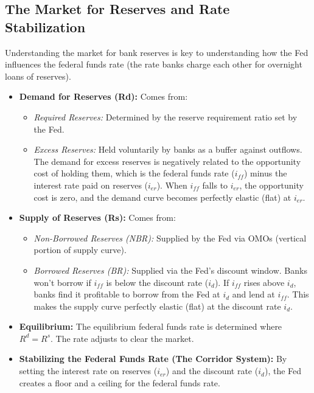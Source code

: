 \subsection{The Market for Reserves and Rate Stabilization}
Understanding the market for bank reserves is key to understanding how the Fed influences the federal funds rate (the rate banks charge each other for overnight loans of reserves).

\begin{itemize}
    \item \textbf{Demand for Reserves (Rd):} Comes from:
        \begin{itemize}
            \item \textit{Required Reserves:} Determined by the reserve requirement ratio set by the Fed.
            \item \textit{Excess Reserves:} Held voluntarily by banks as a buffer against outflows. The demand for excess reserves is negatively related to the opportunity cost of holding them, which is the federal funds rate ($i_{ff}$) minus the interest rate paid on reserves ($i_{er}$). When $i_{ff}$ falls to $i_{er}$, the opportunity cost is zero, and the demand curve becomes perfectly elastic (flat) at $i_{er}$.
        \end{itemize}
    \item \textbf{Supply of Reserves (Rs):} Comes from:
        \begin{itemize}
            \item \textit{Non-Borrowed Reserves (NBR):} Supplied by the Fed via OMOs (vertical portion of supply curve).
            \item \textit{Borrowed Reserves (BR):} Supplied via the Fed's discount window. Banks won't borrow if $i_{ff}$ is below the discount rate ($i_d$). If $i_{ff}$ rises above $i_d$, banks find it profitable to borrow from the Fed at $i_d$ and lend at $i_{ff}$. This makes the supply curve perfectly elastic (flat) at the discount rate $i_d$.
        \end{itemize}
    \item \textbf{Equilibrium:} The equilibrium federal funds rate is determined where $R^d = R^s$. The rate adjusts to clear the market.
    \item \textbf{Stabilizing the Federal Funds Rate (The Corridor System):} By setting the interest rate on reserves ($i_{er}$) and the discount rate ($i_d$), the Fed creates a floor and a ceiling for the federal funds rate.
        \begin{itemize}

\end{itemize}
\end{itemize}
